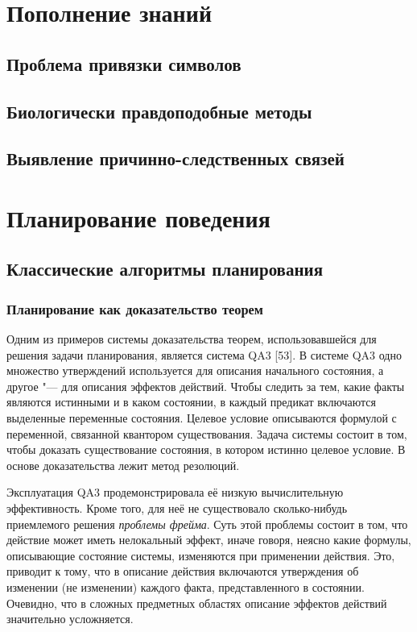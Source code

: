 \documentclass[b5paper,11pt]{book}
\begin{document}
	\chapter{Пополнение знаний}
	
	\section{Проблема привязки символов}
	\section{Биологически правдоподобные методы}
	\section{Выявление причинно-следственных связей}
	
	
	
	\chapter{Планирование поведения}
	
	\section{Классические алгоритмы планирования}
	\subsection{Планирование как доказательство теорем}
	
	Одним из примеров системы доказательства теорем, использовавшейся для решения задачи планирования, является система QA3 [53]. В системе QA3 одно множество утверждений используется для описания начального состояния, а другое "--- для описания эффектов действий. Чтобы следить за тем, какие факты являются истинными и в каком состоянии, в каждый предикат включаются выделенные переменные состояния. Целевое условие описываются формулой с переменной, связанной квантором существования. Задача системы состоит в том, чтобы доказать существование состояния, в котором истинно целевое условие. В основе доказательства лежит метод резолюций.

	Эксплуатация QA3 продемонстрировала её низкую вычислительную эффективность.	Кроме того, для неё не существовало сколько-нибудь приемлемого решения \textit{проблемы фрейма}. Суть этой проблемы состоит в том, что действие может иметь нелокальный эффект, иначе говоря, неясно какие формулы, описывающие состояние системы, изменяются при применении действия. Это, приводит к тому, что в описание действия включаются утверждения об изменении (не изменении) каждого факта, представленного в состоянии. Очевидно, что в сложных предметных областях описание эффектов действий значительно усложняется. 
	
\end{document}
